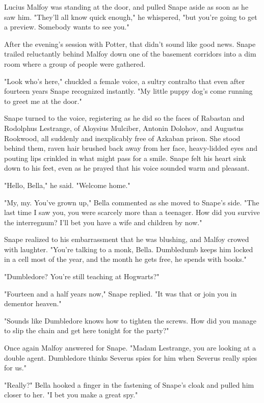 \documentclass[a4paper,11pt]{article}
\begin{document}
Lucius Malfoy was standing at the door, and pulled Snape aside as soon as he saw him. "They'll all know quick enough," he whispered, "but you're going to get a preview. Somebody wants to see you."

After the evening's session with Potter, that didn't sound like good news. Snape trailed reluctantly behind Malfoy down one of the basement corridors into a dim room where a group of people were gathered.

"Look who's here," chuckled a female voice, a sultry contralto that even after fourteen years Snape recognized instantly. "My little puppy dog's come running to greet me at the door."

Snape turned to the voice, registering as he did so the faces of Rabastan and Rodolphus Lestrange, of Aloysius Mulciber, Antonin Dolohov, and Augustus Rookwood, all suddenly and inexplicably free of Azkaban prison. She stood behind them, raven hair brushed back away from her face, heavy-lidded eyes and pouting lips crinkled in what might pass for a smile. Snape felt his heart sink down to his feet, even as he prayed that his voice sounded warm and pleasant.

"Hello, Bella," he said. "Welcome home."

"My, my. You've grown up," Bella commented as she moved to Snape's side. "The last time I saw you, you were scarcely more than a teenager. How did you survive the interregnum? I'll bet you have a wife and children by now."

Snape realized to his embarrassment that he was blushing, and Malfoy crowed with laughter. "You're talking to a monk, Bella. Dumbledumb keeps him locked in a cell most of the year, and the month he gets free, he spends with books."

"Dumbledore? You're still teaching at Hogwarts?"

"Fourteen and a half years now," Snape replied. "It was that or join you in dementor heaven."

"Sounds like Dumbledore knows how to tighten the screws. How did you manage to slip the chain and get here tonight for the party?"

Once again Malfoy answered for Snape. "Madam Lestrange, you are looking at a double agent. Dumbledore thinks Severus spies for him when Severus really spies for us."

"Really?" Bella hooked a finger in the fastening of Snape's cloak and pulled him closer to her. "I bet you make a great spy."
\end{document}
